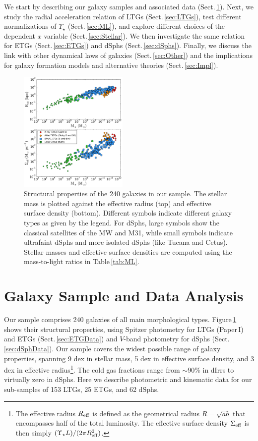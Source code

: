 \documentclass[apjl, twocolappendix]{emulateapj}
\begin{document}
We start by describing our galaxy samples and associated data (Sect.\,\ref{sec:Data}). Next, we study the radial acceleration relation of LTGs (Sect.\,\ref{sec:LTGs}), test different normalizations of $\Upsilon_{\star}$ (Sect.\,\ref{sec:ML}), and explore different choices of the dependent $x$ variable (Sect.\,\ref{sec:Stellar}). We then investigate the same relation for ETGs (Sect.\,\ref{sec:ETGs}) and dSphs (Sect.\,\ref{sec:dSphs}). Finally, we discuss the link with other dynamical laws of galaxies (Sect.\,\ref{sec:Other}) and the implications for galaxy formation models and alternative theories (Sect.\,\ref{sec:Impl}).

\begin{figure}[thb]
\centering
\includegraphics[width=0.47\textwidth]{MR_Todo.pdf}
\caption{Structural properties of the 240 galaxies in our sample. The stellar mass is plotted against the effective radius (top) and effective surface density (bottom). Different symbols indicate different galaxy types as given by the legend. For dSphs, large symbols show the classical satellites of the MW and M31, while small symbols indicate ultrafaint dSphs and more isolated dSphs (like Tucana and Cetus). Stellar masses and effective surface densities are computed using the mass-to-light ratios in Table\,\ref{tab:ML}.}
\label{fig:Sample}
\end{figure}
\section{Galaxy Sample and Data Analysis}\label{sec:Data}

Our sample comprises 240 galaxies of all main morphological types. Figure\,\ref{fig:Sample} shows their structural properties, using Spitzer photometry for LTGs (Paper\,I) and ETGs (Sect.\,\ref{sec:ETGData}) and $V$-band photometry for dSphs (Sect.\,\ref{sec:dSphData}). Our sample covers the widest possible range of galaxy properties, spanning 9 dex in stellar mass, 5 dex in effective surface density, and 3 dex in effective radius\footnote{The effective radius $R_{\rm eff}$ is defined as the geometrical radius $R=\sqrt{ab}$ that encompasses half of the total luminosity. The effective surface density $\Sigma_{\rm eff}$ is then simply $(\Upsilon_{\star}L)/(2\pi R_{\rm eff}^2)$.}. The cold gas fractions range from $\sim$90$\%$ in dIrrs to virtually zero in dSphs. Here we describe photometric and kinematic data for our sub-samples of 153 LTGs, 25 ETGs, and 62 dSphs.
\end{document}
